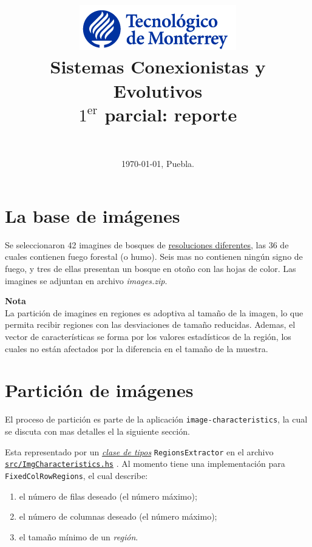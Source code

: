\documentclass{article}
\title{ \includegraphics[scale=0.6, right]{itesm_logo}
	    \\[4em] 
        Sistemas Conexionistas y Evolutivos
        \\[2em]
        $1^\text{er}$ parcial: reporte %
        \\[1em]
        }
\author{ \vspace*{\fill} \red{ Personal Data} \qquad\small \red{Axxxxxxxx} \\[1em] }
\date{ \vspace*{\fill} \today, Puebla.}
\newcommand\refcode[2]{ \href{#1}{\texttt{#2}} }
\newenvironment{note}
    {\begin{mdframed}[leftmargin=1cm, 
                 skipabove=1em,
                 skipbelow=1em,
                 rightline=false, 
                 topline=false,
                 bottomline=false,
                 linewidth=2pt]
        \textbf{Nota}\\}
    {\end{mdframed}}
\begin{document}

\maketitle
\newpage

\def\ImgCharRoot{run:./docs/image-characteristics}
\def\ImgCharacteristics{\ImgCharRoot/ImgCharacteristics.html}
\def\Friday{\ImgCharRoot/ImgCharacteristics-Friday.html}
\def\Extractors{\ImgCharRoot/ImgCharacteristics-Friday-Extractors.html}
\def\ExtractorBuilder{\ImgCharRoot/ImgCharacteristics-ExtractorBuilder.html}
\def\GTK{\ImgCharRoot/ImgCharacteristics-GTK.html}

\def\ExecAll{run:./docs/image-characteristics/img-chv_descriptive-stats_all/src/Main.html}

\def\Nat{run:.docs/Nat/frames.html}

\section{La base de imágenes}

Se seleccionaron 42 imagines de bosques de \underline{resoluciones diferentes}, las 36 de cuales contienen fuego forestal (o humo). Seis mas no contienen ningún signo de fuego, y tres de ellas presentan un bosque en otoño con las hojas de color. Las imagines se adjuntan en archivo \textit{images.zip}.

\begin{note}
La partición de imagines en regiones es adoptiva al tamaño de la imagen, lo que permita recibir regiones con las desviaciones de tamaño reducidas. Ademas, el vector de características se forma por los valores estadísticos de la región, los cuales no están afectados por la diferencia en el tamaño de la muestra.
\end{note}


\section{Partición de imágenes}

El proceso de partición es parte de la aplicación \verb|image-characteristics|, la cual se discuta con mas detalles el la siguiente sección.

Esta representado por un \href{http://learnyouahaskell.com/types-and-typeclasses}{\emph{clase de tipos}} \verb|RegionsExtractor| en el archivo 
\refcode{\ImgCharacteristics}{src/ImgCharacteristics.hs}.
Al momento tiene una implementación para \verb|FixedColRowRegions|, el cual describe:
\begin{enumerate}
\item el número de filas deseado (el número máximo);
\item el número de columnas deseado (el número máximo);
\item el tamaño mínimo de un \emph{región}.
\end{enumerate}
\end{document}

